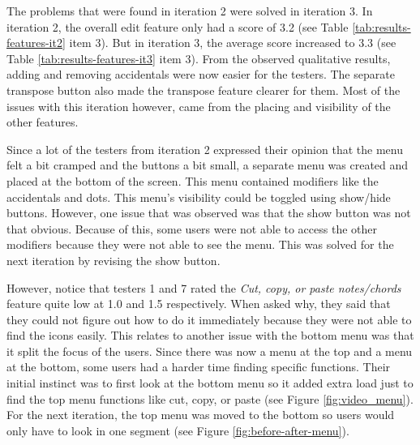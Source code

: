 				The problems that were found in iteration 2 were solved in iteration 3. In iteration 2, the overall edit feature only had a score of 3.2 (see Table \ref{tab:results-features-it2} item 3). But in iteration 3, the average score increased to 3.3 (see Table \ref{tab:results-features-it3} item 3). From the observed qualitative results, adding and removing accidentals were now easier for the testers. The separate transpose button also made the transpose feature clearer for them. Most of the issues with this iteration however, came from the placing and visibility of the other features. 


				Since a lot of the testers from iteration 2 expressed their opinion that the menu felt a bit cramped and the buttons a bit small, a separate menu was created and placed at the bottom of the screen. This menu contained modifiers like the accidentals and dots. This menu's visibility could be toggled using show/hide buttons. However, one issue that was observed was that the show button was not that obvious. Because of this, some users were not able to access the other modifiers because they were not able to see the menu. This was solved for the next iteration by revising the show button. 

				However, notice that testers 1 and 7 rated the \textit{Cut, copy, or paste notes/chords} feature quite low at 1.0 and 1.5 respectively. When asked why, they said that they could not figure out how to do it immediately because they were not able to find the icons easily. This relates to another issue with the bottom menu was that it split the focus of the users. Since there was now a menu at the top and a menu at the bottom, some users had a harder time finding specific functions. Their initial instinct was to first look at the bottom menu so it added extra load just to find the top menu functions like cut, copy, or paste (see Figure \ref{fig:video_menu}). For the next iteration, the top menu was moved to the bottom so users would only have to look in one segment (see Figure \ref{fig:before-after-menu}). 

